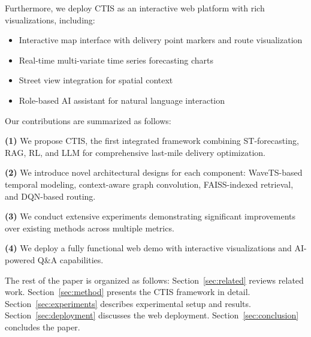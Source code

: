 Furthermore, we deploy CTIS as an interactive web platform with rich visualizations, including:
\begin{itemize}[leftmargin=*]
    \item Interactive map interface with delivery point markers and route visualization
    \item Real-time multi-variate time series forecasting charts
    \item Street view integration for spatial context
    \item Role-based AI assistant for natural language interaction
\end{itemize}

Our contributions are summarized as follows:

\noindent\textbf{(1)} We propose CTIS, the first integrated framework combining ST-forecasting, RAG, RL, and LLM for comprehensive last-mile delivery optimization.

\noindent\textbf{(2)} We introduce novel architectural designs for each component: WaveTS-based temporal modeling, context-aware graph convolution, FAISS-indexed retrieval, and DQN-based routing.

\noindent\textbf{(3)} We conduct extensive experiments demonstrating significant improvements over existing methods across multiple metrics.

\noindent\textbf{(4)} We deploy a fully functional web demo with interactive visualizations and AI-powered Q\&A capabilities.

The rest of the paper is organized as follows: Section~\ref{sec:related} reviews related work. Section~\ref{sec:method} presents the CTIS framework in detail. Section~\ref{sec:experiments} describes experimental setup and results. Section~\ref{sec:deployment} discusses the web deployment. Section~\ref{sec:conclusion} concludes the paper.

